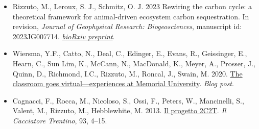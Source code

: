 
\begin{itemize} 
  \item \textcolor{awesome}{Rizzuto, M.}, Leroux, S. J., Schmitz, O. J. 2023 Rewiring the carbon cycle: a theoretical framework for animal-driven ecosystem carbon sequestration. In revision, \emph{Journal of Geophysical Research: Biogeosciences}, manuscript id: 2023JG007714. \href{https://doi.org/10.1101/2023.07.14.549071}{\emph{bioRxiv preprint}}.
\end{itemize}


\begin{itemize}
  \item Wiersma, Y.F., Catto, N., Deal, C., Edinger, E., Evans, R., Geissinger, E., Hearn, C., Sun Lim, K., McCann, N., MacDonald, K., Meyer, A., Prosser, J., Quinn, D., Richmond, I.C., \textcolor{awesome}{Rizzuto, M.}, Roncal, J., Swain, M. 2020. \href{https://nllandscapeecology.com/blog-post-teaching-and-learning-remotely-time-to-read-4-min-45-s/}{The classroom goes virtual---experiences at Memorial University}. \emph{Blog post}.
  \item Cagnacci, F., Rocca, M., Nicoloso, S., Ossi, F., Peters, W., Mancinelli, S., Valent, M., \textcolor{awesome}{Rizzuto, M.}, Hebblewhite, M. 2013. \href{https://en.calameo.com/read/00214567355b1384f96d0}{Il progetto 2C2T}. \emph{Il Cacciatore Trentino}, 93, 4--15.
\end{itemize}


  


  
